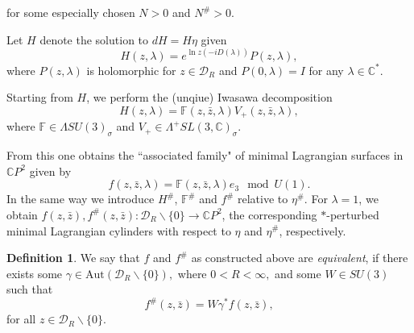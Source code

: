 \documentclass[a4paper,11pt]{amsart}
\theoremstyle{definition}
\newtheorem{definition}{Definition}
\numberwithin{equation}{section}
\newcommand{\C}{\mathbb{C}}
\begin{document}
 for some especially  chosen $N>0$ and $N^{\#}>0$.


 
 Let $H$ denote the solution to $dH=H\eta$ given 
\begin{equation} \label{defH}
H(z,\lambda)=e^{\ln z (-iD(\lambda))}P(z,\lambda),
\end{equation}
 where $P(z,\lambda)$ is holomorphic for $z\in \mathcal{D}_R$ and $P(0,\lambda)=I$ for any $\lambda\in \mathbb{C}^*$. 
 
 Starting from $H$, we perform the (unqiue) Iwasawa decomposition 
 \begin{equation}\label{eq:H-6}
 H(z,\lambda)=\mathbb{F}(z,\bar{z},\lambda) V_+(z,\bar{z},\lambda),
 \end{equation}
 where $\mathbb{F}\in \Lambda SU(3)_{\sigma}$ and $V_+\in \Lambda^{+} SL(3,\mathbb{C})_{\sigma}$. 
 
From this one obtains the ``associated family" of minimal Lagrangian surfaces in $\C P^2$ given by 
$$f(z,\bar{z}, \lambda)=\mathbb{F}(z,\bar{z},\lambda) e_3 \mod  U(1).$$
In the same way we introduce $H^{\#}$, $\mathbb{F}^{\#}$ and  $f^{\#}$ relative to $\eta^{\#}$. 
For $\lambda=1$, we obtain
 $f(z,\bar{z}), f^{\#}(z,\bar{z}): \mathcal{D}_R\backslash\{0\}\rightarrow \C P^2$, the corresponding $*$-perturbed minimal Lagrangian cylinders with respect to $\eta$ and $\eta^{\#}$, respectively. 


\begin{definition}
We say that $f$ and $f^{\#}$ as constructed above are \emph{ equivalent}, if there exists some 
$\gamma \in \mathrm{Aut}(\mathcal{D}_R \backslash \{0\}),$ where $0 < R < \infty,$ and some $W \in SU(3)$ such that
\begin{equation}\label{eq:sym0}
f^{\#}(z,\bar{z})=W \gamma^*f( z, \bar{z}),
\end{equation}
for all $z\in \mathcal{D}_R\backslash\{0\}$.
\end{definition}
\end{document}
